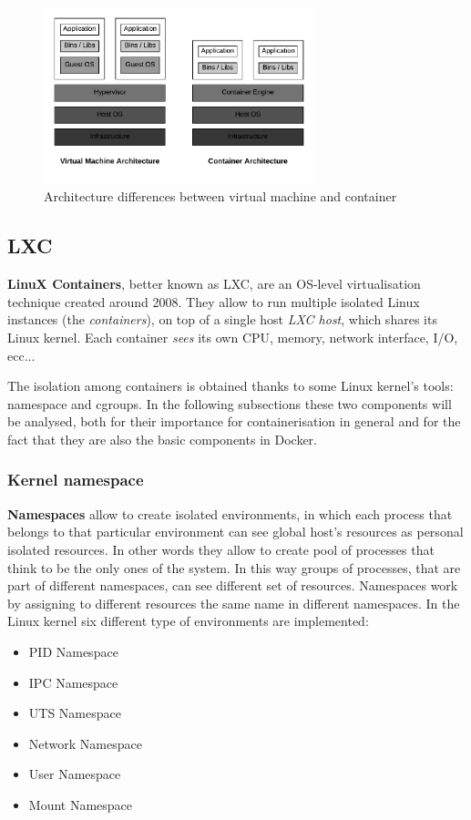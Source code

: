 \documentclass[a4paper,12pt]{article}
\begin{document}
\begin{figure}[h]
  \centerline{\includegraphics[width=0.7\textwidth]{Architecture-differences-between-virtual-machine-and-container.png}}
  \caption{Architecture differences between virtual machine and container}
  \label{fig:hypervisor_container_difference}
  \end{figure}


\subsection{LXC}

\textbf{LinuX Containers}, better known as LXC, are an OS-level virtualisation
technique created around 2008. They allow to run multiple isolated Linux
instances (the \textit{containers}), on top of a single host \textit{LXC host},
which shares its Linux kernel. Each container \textit{sees} its own CPU, memory,
network interface, I/O, ecc... \par The isolation among containers is obtained
thanks to some Linux kernel's tools: namespace and cgroups. In the following
subsections these two components will be analysed, both for their importance for
containerisation in general and for the fact that they are also the basic
components in Docker.

\subsubsection{Kernel namespace}

\textbf{Namespaces} allow to create isolated environments, in which each process
that belongs to that particular environment can see global host's resources as
personal isolated resources. In other words they allow to create pool of
processes that think to be the only ones of the system. In this way groups of
processes, that are part of different namespaces, can see different set of
resources. Namespaces work by assigning to different resources the same name in
different namespaces. In the Linux kernel six different type of environments are
implemented:
  \begin{itemize}
    \item PID Namespace
    \item IPC Namespace
    \item UTS Namespace
    \item Network Namespace
    \item User Namespace
    \item Mount Namespace
  \end{itemize} 
\end{document}
